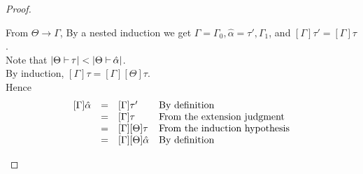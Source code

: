 \documentclass[a4paper]{article}
\def\CompactJudgments{0}
\newcommand{\entails}{\mathrel{\ifnum\CompactJudgments=1\vdash \else \vdash\,\fi}}
\newcommand{\extendssym}{\longrightarrow}
\newcommand{\extends}[2]{{#1} \extendssym {#2}}
\newcommand{\substextend}[2]{\extends{#1}{#2}}
\newcommand{\typesize}[2]{|{#1} {\;\entails} {#2}|}
\newcommand{\ahat}{\hat{\alpha}}
\begin{document}
\begin{proof}
\begin{itemize}
          From $\substextend{\Theta}{\Gamma}$, 
          By a nested induction we get $\Gamma = \Gamma_0, \ahat=\tau', \Gamma_1$, 
                                   and $[\Gamma]\tau' = [\Gamma]\tau$. \\
          Note that $\typesize{\Theta}{\tau} < \typesize{\Theta}{\ahat}$. \\
          By induction, $[\Gamma]\tau = [\Gamma][\Theta]\tau$. \\
          Hence 
          \begin{displaymath}
            \begin{array}[b]{lcll}
              [\Gamma]\ahat & = & [\Gamma]\tau'        & \mbox{By definition} \\
                            & = & [\Gamma]\tau         & \mbox{From the extension judgment} \\
                            & = & [\Gamma][\Theta]\tau & \mbox{From the induction hypothesis} \\
                            & = & [\Gamma][\Theta]\ahat & \mbox{By definition}
\end{array}
            \qedhere
          \end{displaymath}
\end{itemize}
\end{proof}
\end{document}
